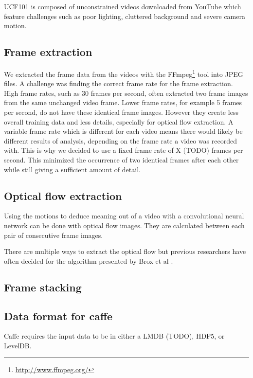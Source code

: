 UCF101 is composed of unconstrained videos downloaded
from YouTube which feature challenges such as poor lighting,
cluttered background and severe camera motion.


\subsection{Frame extraction}
We extracted the frame data from the videos with the FFmpeg\footnote{\url{http://www.ffmpeg.org/}} tool into JPEG files.
A challenge was finding the correct frame rate for the frame extraction.
High frame rates, such as 30 frames per second, often extracted two frame images from the same unchanged video frame.
Lower frame rates, for example 5 frames per second, do not have these identical frame images.
However they create less overall training data and less details, especially for optical flow extraction.
A variable frame rate which is different for each video means there would likely be different results of analysis, depending on the frame rate a video was recorded with.
This is why we decided to use a fixed frame rate of X (TODO) frames per second.
This minimized the occurrence of two identical frames after each other while still giving a sufficient amount of detail.

\subsection{Optical flow extraction}
Using the motions to deduce meaning out of a video with a convolutional neural network can be done with optical flow images.
They are calculated between each pair of consecutive frame images.

There are multiple ways to extract the optical flow but previous researchers  have often decided for the algorithm presented by Brox et al
\cite{brox2004high}.



\subsection{Frame stacking}


\subsection{Data format for caffe}
Caffe requires the input data to be in either a LMDB (TODO), HDF5, or LevelDB.


